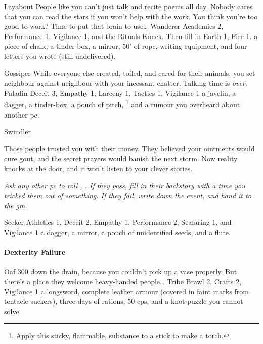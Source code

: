 \begin{multicols}{2}
\begin{itemize}
    {Layabout}%
    {
      People like you can't just talk and recite poems all day.
      Nobody cares that you can read the stars if you won't help with the work.
      You think you're too good to work?
      Time to put that brain to use\ldots
    }%
    {Wanderer}%
    {%
      Academics 2, Performance 1, Vigilance 1, and the Rituals Knack.
    Then fill in Earth 1, Fire 1.
    }%
    {
      a piece of chalk, a tinder-box, a mirror, 50' of rope, writing equipment, and four letters you wrote (still undelivered).
    }%

    {Gossiper}%
    {
      While everyone else created, toiled, and cared for their animals, you set neighbour against neighbour with your incessant chatter.
      Talking time is \emph{over}.
    }%
    {Paladin}%
    {Deceit 3, Empathy 1, Larceny 1, Tactics 1, Vigilance 1}%
    {
      a javelin, a dagger, a tinder-box, a pouch of pitch,%
      \footnote{Apply this sticky, flammable, substance to a stick to make a torch.}
      and a rumour you overheard about another \gls{pc}.
    }%

    {Swindler}%
    {
      Those people trusted you with their money.
      They believed your ointments would cure gout, and the secret prayers would banish the next storm.
      Now reality knocks at the door, and it won't listen to your clever stories.

      \textit{Ask any other \gls{pc} to roll , .
      If they pass, fill in their backstory with a time you tricked them out of something.
      If they fail, write down the event, and hand it to the \gls{gm}.}
    }%
    {Seeker}%
    {Athletics 1, Deceit 2, Empathy 1, Performance 2, Seafaring 1, and Vigilance 1}%
    {
      a dagger, a mirror, a pouch of unidentified seeds, and a flute.
    }%

\end{itemize}

\paragraph{Dexterity Failure}

\begin{itemize}

    {Oaf}%
    {
      300  down the drain, because you couldn't pick up a vase properly.
      But there's a place they welcome heavy-handed people\ldots
    }%
    {Tribe}%
    {
      Brawl 2, Crafts 2, Vigilance 1
    }%
    {
      a longsword, complete leather armour (covered in faint marks from tentacle suckers), three days of rations, 50 \glspl{cp}, and a knot-puzzle you cannot solve.
    }%


\end{itemize}
\end{multicols}
